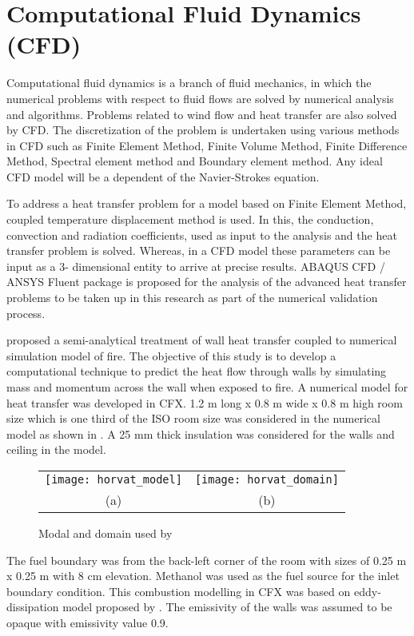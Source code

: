 \section{Computational Fluid Dynamics (CFD)}

Computational fluid dynamics is a branch of fluid mechanics, in which the numerical problems with respect to fluid flows are solved by numerical analysis and algorithms. Problems related to wind flow and heat transfer are also solved by CFD. The discretization of the problem is undertaken using various methods in CFD such as Finite Element Method, Finite Volume Method, Finite Difference Method, Spectral element method and Boundary element method. Any ideal CFD model will be a dependent of the Navier-Strokes equation.  

To address a heat transfer problem for a model based on Finite Element Method, coupled temperature displacement method is used. In this, the conduction, convection and radiation coefficients, used as input to the analysis and the heat transfer problem is solved. Whereas, in a CFD model these parameters can be input as a 3- dimensional entity to arrive at precise results. ABAQUS CFD / ANSYS Fluent package is proposed for the analysis of the advanced heat transfer problems to be taken up in this research as part of the numerical validation process.

\citet{Horvat2009} proposed a semi-analytical treatment of wall heat transfer coupled to numerical simulation model of fire. The objective of this study is to develop a computational technique to predict the heat flow through walls by simulating mass and momentum across the wall when exposed to fire. A numerical model for heat transfer was developed in CFX. 1.2 m long x 0.8 m wide x 0.8 m high room size which is one third of the ISO room size was considered in the numerical model as shown in . A 25 mm thick insulation was considered for the walls and ceiling in the model.
\begin{figure}[htbp]
	\centering
		\begin{tabular}{cc}
			\texttt{[image: horvat\_model]} &
			\texttt{[image: horvat\_domain]} \\ 
			(a) & (b) \\ 
		\end{tabular} 
		\caption{Modal and domain used by \citet{Horvat2009}}
		\label{fig:horvat_model}
\end{figure}

The fuel boundary was from the back-left corner of the room with sizes of 0.25 m x 0.25 m with 8 cm elevation. Methanol was used as the fuel source for the inlet boundary condition. This combustion modelling in CFX was based on eddy-dissipation model proposed by \citet{Magnussen1977}. The emissivity of the walls was assumed to be opaque with emissivity value 0.9.

